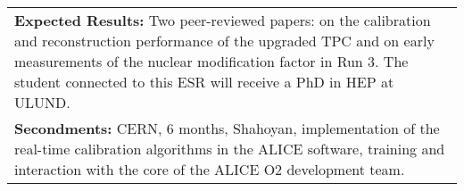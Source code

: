 \begin{center}
{\begin{tabular}{|p{21mm}|p{32mm}|p{15mm}|p{7mm}p{12mm}|p{19mm}|p{30mm}|p{34mm}|}
{}\tabularnewline\hline
\multicolumn{8}{|p{20.2cm}|}{\textbf{\Tstrut Expected Results:}
Two peer-reviewed papers: on the calibration and reconstruction performance of the upgraded TPC and on early measurements of the nuclear modification factor in Run 3. The student connected to this ESR will receive a PhD in HEP at ULUND.
}\tabularnewline\hline
\multicolumn{8}{|p{20.2cm}|}{\textbf{\Tstrut Secondments:}
CERN, 6 months, Shahoyan, implementation of the real-time calibration algorithms in the ALICE software, training and interaction with the core of the ALICE O2 development team. 
}\tabularnewline
\hline
\end{tabular}
}%
\end{center}
%




